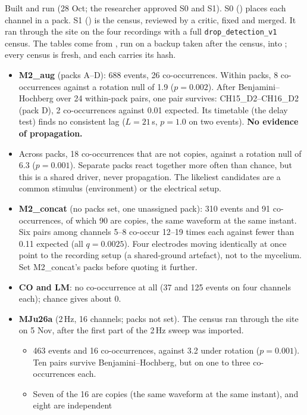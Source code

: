 \begin{instructions}
Built and run (28 Oct; the researcher approved S0 and S1). S0 () places each channel
in a pack. S1 () is the census, reviewed by a critic, fixed and merged. It ran through
the site on the four recordings with a full \texttt{drop\_detection\_v1} census. The tables come from
, run on a backup taken after the census, into
; every census is fresh, and each carries its hash.
\begin{itemize}
  \item \textbf{M2\_aug} (packs A--D): 688 events, 26 co-occurrences. Within packs, 8 co-occurrences against a
        rotation null of 1.9 ($p=0.002$). After Benjamini--Hochberg over 24 within-pack pairs, one pair survives:
        CH15\_D2--CH16\_D2 (pack D), 2 co-occurrences against 0.01 expected. Its timetable (the delay test) finds no
        consistent lag ($L=21$\,s, $p=1.0$ on two events). \textbf{No evidence of propagation.}
  \item Across packs, 18 co-occurrences that are not copies, against a rotation null of 6.3 ($p=0.001$). Separate
        packs react together more often than chance, but this is a shared driver, never propagation. The likeliest
        candidates are a common stimulus (environment) or the electrical setup.
  \item \textbf{M2\_concat} (no packs set, one unassigned pack): 310 events and 91 co-occurrences, of which 90 are
        copies, the same waveform at the same instant. Six pairs among channels 5--8 co-occur 12--19 times each
        against fewer than 0.11 expected (all $q=0.0025$). Four electrodes moving identically at once point to the
        recording setup (a shared-ground artefact), not to the mycelium. Set M2\_concat's packs before quoting it
        further.
  \item \textbf{CO and LM}: no co-occurrence at all (37 and 125 events on four channels each); chance gives about 0.
  \item \textbf{MJu26a} (2\,Hz, 16 channels; packs not set). The census ran through the site on 5 Nov, after the
        first part of the 2\,Hz sweep was imported.
        \begin{itemize}
          \item 463 events and 16 co-occurrences, against 3.2 under rotation ($p=0.001$). Ten pairs survive
                Benjamini--Hochberg, but on one to three co-occurrences each.
          \item Seven of the 16 are copies (the same waveform at the same instant), and eight are independent

\end{itemize}
\end{itemize}
\end{instructions}
